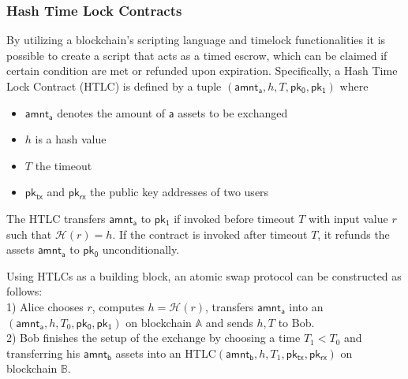 \documentclass{article}      	%
\begin{document}

\subsubsection{Hash Time Lock Contracts}

By utilizing a blockchain's scripting language and timelock functionalities it is possible to create a script that acts as a timed escrow, which can be claimed if certain condition are met or refunded upon expiration.
Specifically, a Hash Time Lock Contract (HTLC) is defined by a tuple $(\mathsf{amnt_a}, h, T, \mathsf{pk_0}, \mathsf{pk_1})$ where 
\begin{itemize}
	\item $\mathsf{amnt_a}$ denotes the amount of $\mathsf{a}$ assets to be exchanged
	\item $h$ is a hash value
	\item $T$ the timeout
	\item $\mathsf{pk_{tx}}$ and $\mathsf{pk_{rx}}$ the public key addresses of two users
\end{itemize}

The HTLC transfers $\mathsf{amnt_a}$ to $\mathsf{pk_1}$ if invoked before timeout $T$ with input value $r$ such that $\mathcal{H}(r) = h$. 
If the contract is invoked after timeout $T$, it refunds the assets $\mathsf{amnt_a}$ to $\mathsf{pk_0}$ unconditionally.

Using HTLCs as a building block, an atomic swap protocol can be constructed as follows: \\
1) Alice chooses $r$, computes $h = \mathcal{H}(r)$, transfers $\mathsf{amnt_a}$ into an $(\mathsf{amnt_a}, h, T_0, \mathsf{pk_0}, \mathsf{pk_1})$ on blockchain $\mathbb{A}$ and sends $h,T$ to Bob. \\
2) Bob finishes the setup of the exchange by choosing a time $T_1 < T_0$ and transferring his $\mathsf{amnt_b}$ assets into an HTLC$(\mathsf{amnt_b}, h, T_1, \mathsf{pk_{tx}}, \mathsf{pk_{rx}})$ on blockchain $\mathbb{B}$. 
\end{document}
